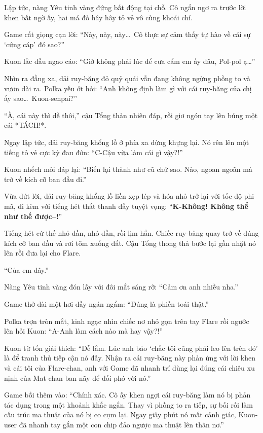 \documentclass[../main.tex]{subfiles}
\begin{document}
Lập tức, nàng Yêu tinh vàng đứng bất động tại chỗ. Cô ngẩn ngơ ra trước lời khen bất ngờ ấy, hai má đỏ hây hây tỏ vẻ vô cùng khoái chí.


Game cất giọng cạn lời: ``Này, này, này\dots\ Cô thực sự cảm thấy tự hào về cái sự `cứng cáp' đó sao?''

Kuon lắc đầu ngao cáo: ``Giờ không phải lúc để cưa cẩm em ấy đâu, Pol-pol ạ\dots''

Nhìn ra đằng xa, dải ruy-băng đỏ quỷ quái vẫn đang không ngừng phồng to và vươn dài ra. Polka yếu ớt hỏi: ``Anh không định làm gì với cái ruy-băng của chị ấy sao\dots\ Kuon-senpai?''

``À, cái này thì dễ thôi,'' cậu Tổng thản nhiên đáp, rồi giơ ngón tay lên búng một cái *TÁCH!*.

Ngay lập tức, dải ruy-băng khổng lồ ở phía xa dừng khựng lại. Nó rên lên một tiếng tỏ vẻ cực kỳ đau đớn: ``C-Cậu vừa làm cái gì vậy?!''

Kuon nhếch môi đáp lại: ``Biến lại thành như cũ chứ sao. Nào, ngoan ngoãn mà trở về kích cỡ ban đầu đi.''

Vừa dứt lời, dải ruy-băng khổng lồ liền xẹp lép và hóa nhỏ trở lại với tốc độ phi mã, đi kèm với tiếng hét thất thanh đầy tuyệt vọng: ``\textbf{K-Không! Không thể như thế được--!}''

Tiếng hét cứ thế nhỏ dần, nhỏ dần, rồi lịm hẳn. Chiếc ruy-băng quay trở về đúng kích cỡ ban đầu và rơi tõm xuống đất. Cậu Tổng thong thả bước lại gần nhặt nó lên rồi đưa lại cho Flare.

``Của em đây.''

Nàng Yêu tinh vàng đón lấy với đôi mắt sáng rỡ: ``Cảm ơn anh nhiều nha.''

Game thở dài một hơi đầy ngán ngẩm: ``Đúng là phiền toái thật.''

Polka trợn tròn mắt, kinh ngạc nhìn chiếc nơ nhỏ gọn trên tay Flare rồi ngước lên hỏi Kuon: ``A-Anh làm cách nào mà hay vậy?!''

Kuon từ tốn giải thích: ``Dễ lắm. Lúc anh bảo `chắc tôi cũng phải leo lên trên đó' là để tranh thủ tiếp cận nó đấy. Nhận ra cái ruy-băng này phản ứng với lời khen và cái tôi của Flare-chan, anh với Game đã nhanh trí dùng lại đúng cái chiêu xu nịnh của Mat-chan ban nãy để đối phó với nó.''

Game bồi thêm vào: ``Chính xác. Cô ấy khen ngợi cái ruy-băng làm nó bị phản tác dụng trong một khoảnh khắc ngắn. Thay vì phồng to ra tiếp, sự bối rối làm cấu trúc ma thuật của nó bị co cụm lại. Ngay giây phút nó mất cảnh giác, Kuon-user đã nhanh tay gắn một con chip đảo ngược ma thuật lên thân nơ.''
\end{document}
